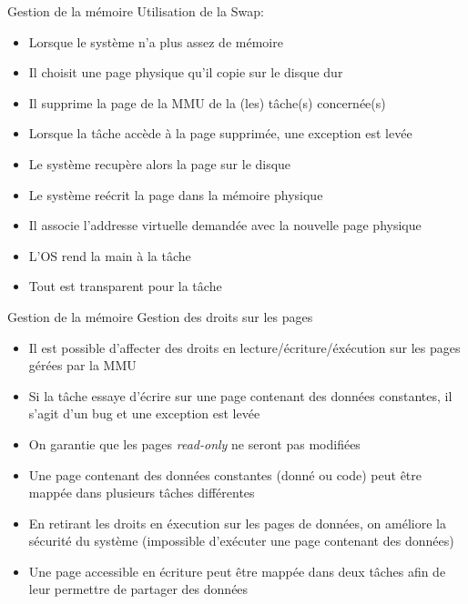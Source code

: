 \begin{frame}{Gestion de la mémoire}
  Utilisation de la Swap:
  \begin{itemize}
  \item Lorsque le système n'a plus assez de mémoire
  \item Il choisit une page physique qu'il copie sur le disque dur
  \item  Il  supprime  la  page   de  la  MMU  de  la  (les)  tâche(s)
    concernée(s)
  \item Lorsque la tâche accède à la page supprimée, une exception est
    levée
  \item Le système recupère alors la page sur le disque
  \item Le système reécrit la page dans la mémoire physique
  \item Il associe l'addresse virtuelle demandée avec la nouvelle page
    physique
  \item L'OS rend la main à la tâche
  \item Tout est transparent pour la tâche
  \end{itemize}
\end{frame}

\begin{frame}{Gestion de la mémoire}
  Gestion des droits sur les pages
  \begin{itemize}
  \item    Il    est     possible    d'affecter    des    droits    en
    lecture/écriture/éxécution sur les pages gérées par la MMU
  \item Si la tâche essaye d'écrire sur une page contenant des données
    constantes, il s'agit d'un bug et une exception est levée
  \item  On garantie  que  les pages  \emph{read-only}  ne seront  pas
    modifiées
  \item Une page contenant des  données constantes (donné ou code) peut
    être mappée dans plusieurs tâches différentes
  \item En retirant les droits  en éxecution sur les pages de données,
    on améliore la sécurité du système (impossible d'exécuter une page
    contenant des données)
  \item Une  page accessible  en écriture peut  être mappée  dans deux
    tâches afin de leur permettre de partager des données
  \end{itemize} 
\end{frame}

